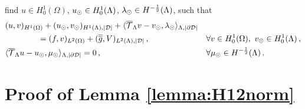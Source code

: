 find $u \in H^1_0(\Omega)$, $u_{\odot} \in H^1_0(\Lambda)$, $\lambda_{\odot} \in H^{-\frac 1 2}(\Lambda)$, such that
\begin{subequations}
\begin{align*}
&(u,v)_{H^1(\Omega)} + (u_{\odot},v_{\odot})_{H^1(\Lambda),|\mathcal{D}|} 
+  \langle {\overline{\mathcal{T}}_\Lambda} v - v_{\odot}, \lambda_{\odot} \rangle_{\Lambda, |\partial\mathcal{D}|} &&
\\
\nonumber
&\qquad\qquad= (f,v)_{L^2(\Omega)} +  (\overline{\overline{g}},V)_{L^2(\Lambda),|\mathcal{D}|}\,,
\quad && \forall v \in H^1_0(\Omega), \ v_{\odot} \in H^1_0(\Lambda)\,,
\\
& \langle {\overline{\mathcal{T}}_\Lambda} u -   u_{\odot}, \mu_{\odot} \rangle_{\Lambda,|\partial\mathcal{D}|} = 0\,,
\quad &&\forall \mu_{\odot} \in H^{-\frac 1 2}(\Lambda)\,.
\end{align*}
\end{subequations}


\section{Proof of Lemma \ref{lemma:H12norm}}

